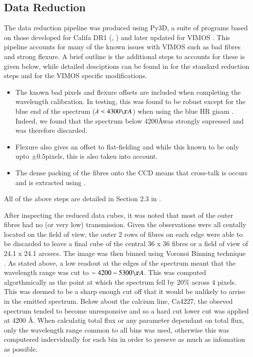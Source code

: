 \documentclass[a4paper,fleqn,usenatbib,useAMS]{mnras}
\begin{document}
	\subsection{Data Reduction}
		\label{subsec:reduct}
		The data reduction pipeline was produced using Py3D, a suite of programs based on those developed for Califa DR1 (\citep{Sanchez2011}, \citep{Husemann2013}) and later updated for VIMOS \citep{Husemann2014}. This pipeline accounts for many of the known issues with VIMOS such as bad fibres and strong flexure. A brief outline is the additional steps to accounts for these is given below, while detailed desciptions can be found in \citet{Sanchez2011} for the standard reduction steps and \citep{Husemann2014} for the VIMOS specific modifications. 
		\begin{itemize}
		\item The known bad pixels and flexure offsets are included when completing the wavelength calibration. In testing, this was found to be robust except for the blue end of the spectrum ($\lambda < 4300 \AA$) when using the blue HR gisam \citep{Husemann2014}. Indeed, we found that the spectrum below 4200\AA was strongly supressed and was therefore discarded.
		\item Flexure also gives an offset to flat-fielding and while this known to be only upto $\pm0.5$pixels, this is also taken into account.
		\item The dense packing of the fibres onto the CCD means that cross-talk is occurs and is extracted using \citep{Horne1986}. 
		\end{itemize}
		All of the above steps are detailed in Section 2.3 in \citet{Husemann2014}.

		After inspecting the reduced data cubes, it was noted that most of the outer fibres had no (or very low) transmission. Given the observations were all centally located on the field of view, the outer 2 rows of fibres on each edge were able to be discarded to leave a final cube of the central 36 x 36 fibres or a field of view of 24.1 x 24.1 arcsecs. The image was then binned using Voronoi Binning technique \citep{Cappellari2003}. As stated above, a low readout at the edges of the spectrum meant that the wavelength range was cut to $\sim 4200 - 5300 \AA$. This was computed algorthmically as the point at which the spectrum fell by 20\% across 4 pixels. This was deemed to be a sharp enough cut off that it would be unlikely to arrise in the emitted spectrum. Below about the calcium line, Ca4227, the obseved spectrum tended to become unresponsive and so a hard cut lower cut was applied at 4200 \AA. When calculatig total flux or any parameter dependant on total flux, only the wavelength range common to all bins was used, otherwise this was computered indervidually for each bin in order to preseve as much as infomation as possible.
\end{document}

